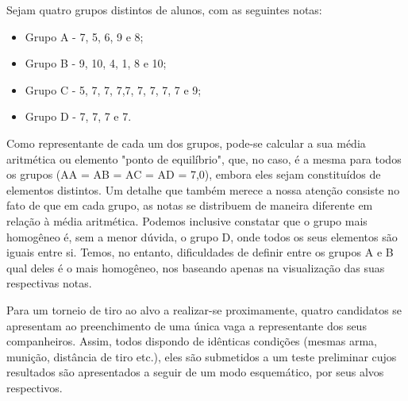Sejam quatro grupos distintos de alunos, com as seguintes notas:
\vskip0.3cm

  \begin{itemize}
    \item Grupo A - 7, 5, 6, 9 e 8;
    \item Grupo B - 9, 10, 4, 1, 8 e 10;
    \item Grupo C - 5, 7, 7, 7,7, 7, 7, 7, 7 e 9;
    \item Grupo D - 7, 7, 7 e 7.
  \end{itemize}

\vskip0.3cm
Como representante de cada um dos grupos, pode-se calcular  a  sua média  aritméti\-ca  ou elemento  "ponto  de  equilíbrio",  que,  no  caso,  é  a mesma para todos os grupos (AA =  AB = AC = AD = 7,0), embora eles sejam constituídos de elementos distintos. Um detalhe que também merece a nossa atenção consiste no fato de que em cada grupo, as notas se distribuem de maneira diferente em relação à média aritmética. Podemos inclusive constatar que o grupo mais homogêneo é, sem a menor dúvida, o grupo D, onde todos os seus elementos são iguais entre si. Temos, no entanto, dificuldades de definir entre os grupos A e B qual deles é o mais homogêneo, nos baseando apenas na visualização das suas respectivas notas.\vskip0.3cm

Para um torneio de tiro ao alvo a realizar-se proximamente, quatro candidatos se apresentam ao preenchimento de uma única vaga a representante dos seus companheiros. Assim, todos dispondo de idênticas condições (mesmas arma, munição, distância de tiro etc.), eles são submetidos a um teste preliminar cujos resultados são apresentados a seguir de um modo esquemático, por seus alvos respectivos.


